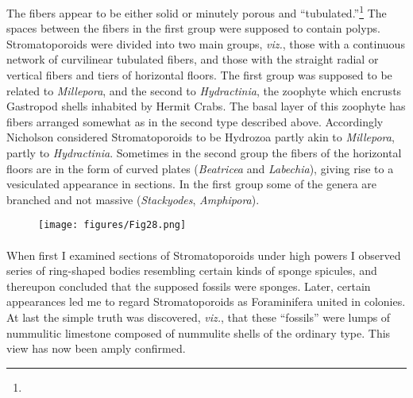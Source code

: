 \documentclass[a4paper, 12pt, oneside]{article}
\begin{document}
The fibers appear to be either solid or minutely porous and ``tubulated.''\footnote{} The spaces between the fibers in the first group were supposed to contain polyps. Stromatoporoids were divided into two main groups, \emph{viz.}, those with a continuous network of curvilinear tubulated fibers, and those with the straight radial or vertical fibers and tiers of horizontal floors. The first group was supposed to be related to \emph{Millepora}, and the second to \emph{Hydractinia}, the zoophyte which encrusts Gastropod shells inhabited by Hermit Crabs. The basal layer of this zoophyte has fibers arranged somewhat as in the second type described above. Accordingly Nicholson considered Stromatoporoids to be Hydrozoa partly akin to \emph{Millepora}, partly to \emph{Hydractinia}. Sometimes in the second group the fibers of the horizontal floors are in the form of curved plates (\emph{Beatricea} and \emph{Labechia}), giving rise to a vesiculated appearance in sections. In the first group some of the genera are branched and not massive (\emph{Stackyodes}, \emph{Amphipora}).
\begin{figure}[H]
\centering
\texttt{[image: figures/Fig28.png]}
\caption*{}
\end{figure}
\paragraph{}
When first I examined sections of Stromatoporoids under high powers I observed series of ring-shaped bodies resembling certain kinds of sponge spicules, and thereupon concluded that the supposed fossils were sponges. Later, certain appearances led me to regard Stromatoporoids as Foraminifera united in colonies. At last the simple truth was discovered, \emph{viz.}, that these ``fossils'' were lumps of nummulitic limestone composed of nummulite shells of the ordinary type. This view has now been amply confirmed.
\end{document}
